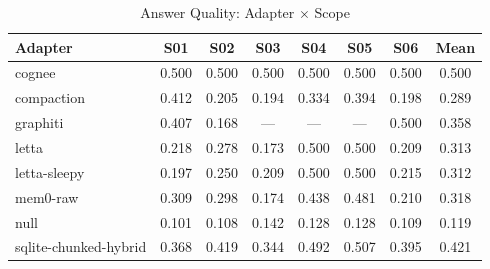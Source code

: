 \begin{table}[t]
\centering
\caption{Answer Quality: Adapter $\times$ Scope}
\label{tab:heatmap}
\begin{tabular}{lccccccc}
\toprule
Adapter & S01 & S02 & S03 & S04 & S05 & S06 & Mean \\
\midrule
  cognee & 0.500 & 0.500 & 0.500 & 0.500 & 0.500 & 0.500 & 0.500 \\
  compaction & 0.412 & 0.205 & 0.194 & 0.334 & 0.394 & 0.198 & 0.289 \\
  graphiti & 0.407 & 0.168 & --- & --- & --- & 0.500 & 0.358 \\
  letta & 0.218 & 0.278 & 0.173 & 0.500 & 0.500 & 0.209 & 0.313 \\
  letta-sleepy & 0.197 & 0.250 & 0.209 & 0.500 & 0.500 & 0.215 & 0.312 \\
  mem0-raw & 0.309 & 0.298 & 0.174 & 0.438 & 0.481 & 0.210 & 0.318 \\
  null & 0.101 & 0.108 & 0.142 & 0.128 & 0.128 & 0.109 & 0.119 \\
  sqlite-chunked-hybrid & 0.368 & 0.419 & 0.344 & 0.492 & 0.507 & 0.395 & 0.421 \\
\bottomrule
\end{tabular}
\end{table}
